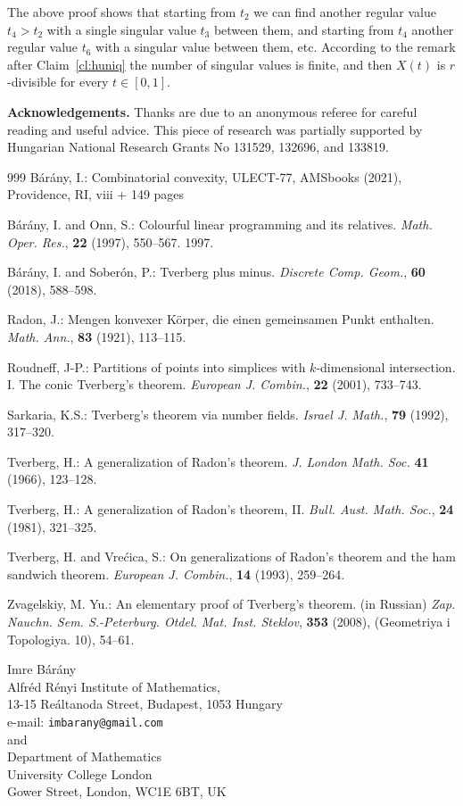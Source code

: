 \documentclass[12pt,a4paper]{amsart}
\numberwithin{equation}{section}
\begin{document}
\smallskip
The above proof shows that starting from $t_2$ we can find another regular value $t_4>t_2$ with a single singular value $t_3$ between them, and starting from $t_4$ another regular value $t_6$ with a singular value between them, etc. According to the remark after Claim~\ref{cl:huniq} the number of singular values is finite, and then $X(t)$ is $r$-divisible for every $t\in [0,1]$.




\bigskip
{\bf Acknowledgements.} Thanks are due to an anonymous referee for careful reading and useful advice. This piece of research was partially supported by Hungarian National Research Grants No 131529, 132696, and 133819.


\bigskip



\begin{thebibliography}{999}
 B\'ar\'any, I.: Combinatorial convexity, ULECT-77, AMSbooks (2021), Providence, RI, viii + 149 pages

B\'ar\'any, I. and Onn, S.: Colourful linear programming and its relatives. {\it Math. Oper. Res.}, {\bf 22} (1997), 550--567.
1997.

B\'ar\'any, I. and Sober\'on, P.: Tverberg plus minus. {\it Discrete Comp. Geom.}, {\bf  60} (2018), 588--598.

Radon, J.: Mengen konvexer K\"orper, die einen gemeinsamen Punkt enthalten. {\it Math. Ann.}, {\bf 83} (1921), 113--115.

Roudneff,  J-P.: Partitions of points into simplices with $k$-dimensional intersection. I. The conic Tverberg's theorem. {\it European J. Combin.}, {\bf 22} (2001),
733--743.

Sarkaria, K.S.: Tverberg's theorem via number fields. {\it Israel J. Math.}, {\bf 79} (1992), 317--320.

Tverberg, H.:  A generalization of Radon's theorem. {\it J. London Math. Soc.} {\bf 41} (1966), 123--128.

Tverberg, H.: A generalization of Radon's theorem, II. {\it Bull. Aust. Math. Soc.}, {\bf 24} (1981), 321--325.

Tverberg, H. and Vre\'cica, S.:
On generalizations of Radon's theorem and the ham sandwich theorem. {\it European J. Combin.}, {\bf 14} (1993), 259--264.

Zvagelskiy, M. Yu.: An elementary proof of Tverberg's theorem. (in Russian) {\it Zap. Nauchn. Sem. S.-Peterburg. Otdel. Mat. Inst. Steklov}, {\bf 353} (2008), (Geometriya i Topologiya. 10), 54--61.
\end{thebibliography}
\bigskip

\noindent
Imre B\'ar\'any \\
Alfr\'ed R\'enyi Institute of Mathematics,\\
13-15 Re\'altanoda Street, Budapest, 1053 Hungary\\
e-mail: {\tt imbarany@gmail.com}\\
and\\
Department of Mathematics\\
University College London\\
Gower Street, London, WC1E 6BT, UK
\end{document}
